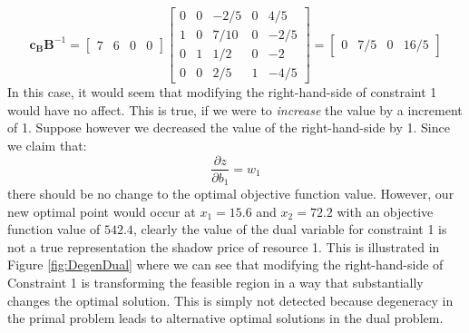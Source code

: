 \begin{example}
\begin{displaymath}
\mathbf{c}_\mathbf{B}\mathbf{B}^{-1} = 
\begin{bmatrix}7&6&0&0\end{bmatrix}
\begin{bmatrix}
 0 & 0 & -2/5 		& 0  & 4/5\\
 1 & 0 & 7/10 		& 0  & -2/5\\
 0 & 1 & 1/2 		& 0  & -2\\
 0 & 0 & 2/5 		& 1  & -4/5
\end{bmatrix} = \begin{bmatrix}0 & 7/5 & 0 & 16/5
\end{bmatrix}
\end{displaymath}
In this case, it would seem that modifying the right-hand-side of constraint 1 would have no affect. This is true, if we were to \textit{increase} the value by a increment of 1. Suppose however we decreased the value of the right-hand-side by 1. Since we claim that:
\begin{equation}
\frac{\partial z}{\partial b_1} = w_1
\end{equation}
there should be no change to the optimal objective function value. However, our new optimal point would occur at $x_1 = 15.6$ and $x_2 = 72.2$ with an objective function value of $542.4$, clearly the value of the dual variable for constraint 1 is not a true representation the shadow price of resource 1. This is illustrated in Figure \ref{fig:DegenDual} where we can see that modifying the right-hand-side of Constraint 1 is transforming the feasible region in a way that substantially changes the optimal solution. This is simply not detected because degeneracy in the primal problem leads to alternative optimal solutions in the dual problem. 


\end{example}
